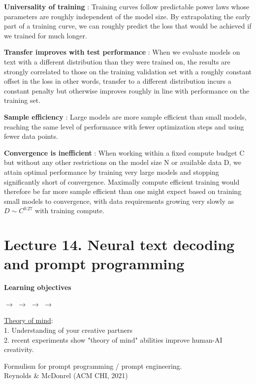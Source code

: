 \documentclass[12pt,a4paper]{article}
\begin{document}
\textbf{Universality of training} : Training curves follow predictable power laws whose parameters are roughly independent of the model size. By extrapolating the early part of a training curve, we can roughly predict the loss that would be achieved if we trained for much longer.

\textbf{Transfer improves with test performance} : When we evaluate models on text with a different distribution than they were trained on, the results are strongly correlated to those on the training validation set with a roughly constant offset in the loss in other words, transfer to a different distribution incurs a constant penalty but otherwise improves roughly in line with performance on the training set.

\textbf{Sample efficiency} : Large models are more sample efficient than small models, reaching the same level of performance with fewer optimization steps and using fewer data points.

\textbf{Convergence is inefficient} : When working within a fixed compute budget C but without any other restrictions on the model size N or available data D, we attain optimal performance by training very large models and stopping significantly short of convergence. Maximally compute efficient training would therefore be far more sample efficient than one might expect based on training small models to convergence, with data requirements growing very slowly as $D\sim C^{0.27}$ with training compute.


\section{Lecture 14. Neural text decoding and prompt programming}

\textbf{Learning objectives}

$\longrightarrow$  $\longrightarrow$  $\longrightarrow$  $\longrightarrow$

\vspace{0.5cm}
\underline{Theory of mind}:\\
1. Understanding of your creative partners\\  
2. recent experiments show "theory of mind" abilities improve human-AI creativity.

\vspace{0.5cm}
Formulism for prompt programming / prompt engineering.\\
Reynolds \& McDonrel (ACM CHI, 2021)
\end{document}

